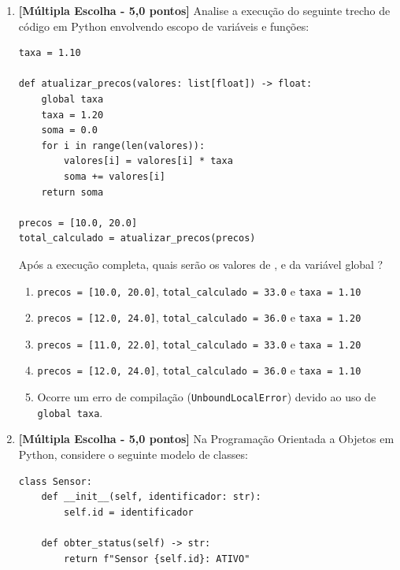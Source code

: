 \begin{enumerate}[label=\textbf{Q\arabic*.}, start=1]


\vspace{0.4cm}

\item \textbf{[Múltipla Escolha - 5,0 pontos]} Analise a execução do seguinte trecho de código em Python envolvendo escopo de variáveis e funções:
\begin{verbatim}
taxa = 1.10

def atualizar_precos(valores: list[float]) -> float:
    global taxa
    taxa = 1.20
    soma = 0.0
    for i in range(len(valores)):
        valores[i] = valores[i] * taxa
        soma += valores[i]
    return soma

precos = [10.0, 20.0]
total_calculado = atualizar_precos(precos)
\end{verbatim}
Após a execução completa, quais serão os valores de ,  e da variável global ?

\begin{enumerate}[label=\textbf{(\Alph*)}]
    \item \texttt{precos = [10.0, 20.0]}, \texttt{total\_calculado = 33.0} e \texttt{taxa = 1.10}
    \item \texttt{precos = [12.0, 24.0]}, \texttt{total\_calculado = 36.0} e \texttt{taxa = 1.20}
    \item \texttt{precos = [11.0, 22.0]}, \texttt{total\_calculado = 33.0} e \texttt{taxa = 1.20}
    \item \texttt{precos = [12.0, 24.0]}, \texttt{total\_calculado = 36.0} e \texttt{taxa = 1.10}
    \item Ocorre um erro de compilação (\texttt{UnboundLocalError}) devido ao uso de \texttt{global taxa}.
\end{enumerate}



\vspace{0.4cm}

\item \textbf{[Múltipla Escolha - 5,0 pontos]} Na Programação Orientada a Objetos em Python, considere o seguinte modelo de classes:
\begin{verbatim}
class Sensor:
    def __init__(self, identificador: str):
        self.id = identificador
    
    def obter_status(self) -> str:
        return f"Sensor {self.id}: ATIVO"


\end{verbatim}
\end{enumerate}
